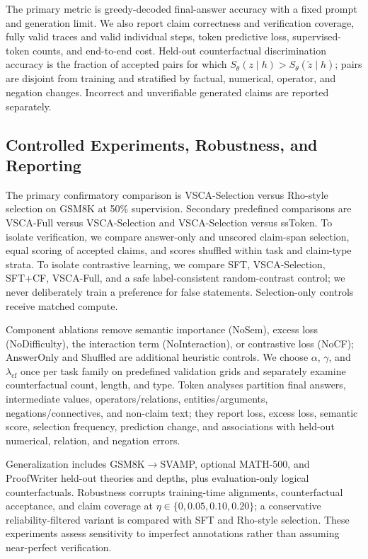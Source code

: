 \documentclass{article}
\newcommand{\vsca}{\textsc{VSCA}}
\begin{document}
The primary metric is greedy-decoded final-answer accuracy with a fixed prompt and generation limit. We also report claim correctness and verification coverage, fully valid traces and valid individual steps, token predictive loss, supervised-token counts, and end-to-end cost. Held-out counterfactual discrimination accuracy is the fraction of accepted pairs for which $S_\theta(z\mid h)>S_\theta(\tilde z\mid h)$; pairs are disjoint from training and stratified by factual, numerical, operator, and negation changes. Incorrect and unverifiable generated claims are reported separately.

\subsection{Controlled Experiments, Robustness, and Reporting}
\label{sec:ablations}
The primary confirmatory comparison is \vsca-Selection versus Rho-style selection on GSM8K at 50\% supervision. Secondary predefined comparisons are \vsca-Full versus \vsca-Selection and \vsca-Selection versus ssToken. To isolate verification, we compare answer-only and unscored claim-span selection, equal scoring of accepted claims, and scores shuffled within task and claim-type strata. To isolate contrastive learning, we compare SFT, \vsca-Selection, SFT+CF, \vsca-Full, and a safe label-consistent random-contrast control; we never deliberately train a preference for false statements. Selection-only controls receive matched compute.

Component ablations remove semantic importance (NoSem), excess loss (NoDifficulty), the interaction term (NoInteraction), or contrastive loss (NoCF); AnswerOnly and Shuffled are additional heuristic controls. We choose $\alpha$, $\gamma$, and $\lambda_{\mathrm{cf}}$ once per task family on predefined validation grids and separately examine counterfactual count, length, and type. Token analyses partition final answers, intermediate values, operators/relations, entities/arguments, negations/connectives, and non-claim text; they report loss, excess loss, semantic score, selection frequency, prediction change, and associations with held-out numerical, relation, and negation errors.

Generalization includes GSM8K$\rightarrow$SVAMP, optional MATH-500, and ProofWriter held-out theories and depths, plus evaluation-only logical counterfactuals. Robustness corrupts training-time alignments, counterfactual acceptance, and claim coverage at $\eta\in\{0,0.05,0.10,0.20\}$; a conservative reliability-filtered variant is compared with SFT and Rho-style selection. These experiments assess sensitivity to imperfect annotations rather than assuming near-perfect verification.
\end{document}
